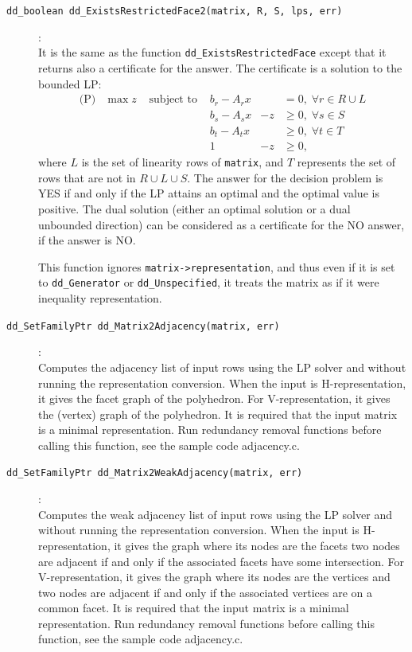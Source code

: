 \documentclass[11pt]{article}
\newcommand {\0} {{\bf 0}}
\begin{document}
\begin{description}
\item[{\tt dd\_boolean dd\_ExistsRestrictedFace2(matrix, R, S, lps, err)}]:\\
It is the same as the function {\tt dd\_ExistsRestrictedFace} except that
it returns also a certificate for the answer.  The certificate is a solution
to the bounded LP:
\[
\begin{array}{lllllll}
\mbox{(P)} &\max  z  &\mbox{ subject to } & b_r - A_r x  &   & = 0, \; \forall r \in R\cup L \\
           &         &                    & b_s - A_s x  &-z &\ge 0, \;  \forall s \in S \\
          &         &                    & b_t - A_t x   &   &\ge 0, \; \forall t \in T \\
         &         &                    & 1              & -z&\ge 0,
\end{array}
\]
where $L$ is the set of linearity rows of {\tt matrix}, and $T$ represents
the set of rows that are not in $R\cup L \cup S$.
The answer for the decision problem is YES if and only if the LP attains
an optimal and the optimal value is positive.  The dual solution (either
an optimal solution or a dual unbounded direction) can be considered
as a certificate for the NO answer, if the answer is NO.

This function ignores {\tt matrix->representation}, and thus even if it is
set to {\tt dd\_Generator} or {\tt dd\_Unspecified}, it treats the matrix
as if it were inequality representation.

\item[{\tt dd\_SetFamilyPtr dd\_Matrix2Adjacency(matrix, err)}]:\\
Computes the adjacency list of input rows using
the LP solver and without running the representation conversion.  When
the input is H-representation, it gives the facet graph of the polyhedron.
For V-representation, it gives the (vertex) graph of the polyhedron.
It is required that the input matrix is a minimal representation.
Run redundancy removal functions before calling this function,
see the sample code adjacency.c.


\item[{\tt dd\_SetFamilyPtr dd\_Matrix2WeakAdjacency(matrix, err)}]:\\
Computes the weak adjacency list of input rows using
the LP solver and without running the representation conversion.  When
the input is H-representation, it gives the graph where its nodes are the facets
two nodes  are adjacent if and only if the associated facets have
some intersection.
For V-representation, it gives the graph where its nodes are the vertices
and two nodes are adjacent if and only if the associated vertices
are on a common facet.
It is required that the input matrix is a minimal representation.
Run redundancy removal functions before calling this function,
see the sample code adjacency.c.


\end{description}
\end{document}
